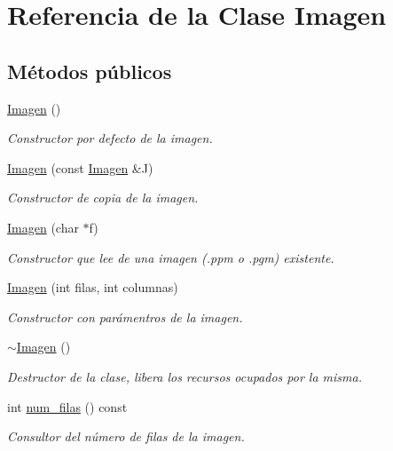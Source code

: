 \hypertarget{classImagen}{}\section{Referencia de la Clase Imagen}
\label{classImagen}
\subsection*{Métodos públicos}
\begin{DoxyCompactItemize}
\item 
\mbox{\label{classImagen_ab2e649aa7a105155c7bfdb846abf0528}} 
\hyperlink{classImagen_ab2e649aa7a105155c7bfdb846abf0528}{Imagen} ()
\begin{DoxyCompactList}\small\item\em Constructor por defecto de la imagen. \end{DoxyCompactList}\item 
\hyperlink{classImagen_a70437d2848ae5b030ee17cf79651a8b5}{Imagen} (const \hyperlink{classImagen}{Imagen} \&J)
\begin{DoxyCompactList}\small\item\em Constructor de copia de la imagen. \end{DoxyCompactList}\item 
\hyperlink{classImagen_a18f5296cfd407b2e2dcbe9c74e2f7f1b}{Imagen} (char $\ast$f)
\begin{DoxyCompactList}\small\item\em Constructor que lee de una imagen (.ppm o .pgm) existente. \end{DoxyCompactList}\item 
\hyperlink{classImagen_a7632978f5ae089713e652bb362da1e78}{Imagen} (int filas, int columnas)
\begin{DoxyCompactList}\small\item\em Constructor con parámentros de la imagen. \end{DoxyCompactList}\item 
\hyperlink{classImagen_a03dd93c9cf920a9dc0b72f8bd34f2e8a}{$\sim$\+Imagen} ()
\begin{DoxyCompactList}\small\item\em Destructor de la clase, libera los recursos ocupados por la misma. \end{DoxyCompactList}\item 
int \hyperlink{classImagen_a4cb4faa04f5e2913965e43a6a65acfd1}{num\+\_\+filas} () const
\begin{DoxyCompactList}\small\item\em Consultor del número de filas de la imagen. \end{DoxyCompactList}\item 

\end{DoxyCompactItemize}
